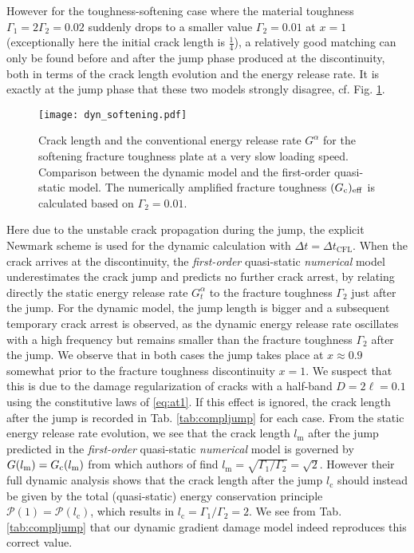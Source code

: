 However for the toughness-softening case where the material toughness $\Gamma_1=2\Gamma_2=0.02$ suddenly drops to a smaller value $\Gamma_2=0.01$ at $x=1$ (exceptionally here the initial crack length is $\frac{1}{4}$), a relatively good matching can only be found before and after the jump phase produced at the discontinuity, both in terms of the crack length evolution and the energy release rate. It is exactly at the jump phase that these two models strongly disagree, cf. Fig. \ref{eq:ressoftening}.
\begin{figure}[htbp]
\centering
\texttt{[image: dyn\_softening.pdf]}
\caption{Crack length and the conventional energy release rate $G^\alpha$ for the softening fracture toughness plate at a very slow loading speed. Comparison between the dynamic model and the first-order quasi-static model. The numerically amplified fracture toughness $(G_\mathrm{c})_\mathrm{eff}$ is calculated based on $\Gamma_2=0.01$.} \label{eq:ressoftening}
\end{figure}
Here due to the unstable crack propagation during the jump, the explicit Newmark scheme is used for the dynamic calculation with $\Delta t=\Delta t_\mathrm{CFL}$. When the crack arrives at the discontinuity, the \emph{first-order} quasi-static \emph{numerical} model underestimates the crack jump and predicts no further crack arrest, by relating directly the static energy release rate $G^\alpha_t$ to the fracture toughness $\Gamma_2$ just after the jump. For the dynamic model, the jump length is bigger and a subsequent temporary crack arrest is observed, as the dynamic energy release rate oscillates with a high frequency but remains smaller than the fracture toughness $\Gamma_2$ after the jump. We observe that in both cases the jump takes place at $x\approx 0.9$ somewhat prior to the fracture toughness discontinuity $x=1$. We suspect that this is due to the damage regularization of cracks with a half-band $D=2\ell=0.1$ using the constitutive laws of \eqref{eq:at1}. If this effect is ignored, the crack length after the jump is recorded in Tab. \ref{tab:compljump} for each case. From the static energy release rate evolution, we see that the crack length $l_\mathrm{m}$ after the jump predicted in the \emph{first-order} quasi-static \emph{numerical} model is governed by $G(l_\mathrm{m})=G_\mathrm{c}(l_\mathrm{m})$ from which authors of \cite{DumouchelMarigoCharlotte:2008} find $l_\mathrm{m}=\sqrt{\Gamma_1/\Gamma_2}=\sqrt{2}$. However their full dynamic analysis shows that the crack length after the jump $l_\mathrm{c}$ should instead be given by the total (quasi-static) energy conservation principle $\mathcal{P}(1)=\mathcal{P}(l_\mathrm{c})$, which results in $l_\mathrm{c}=\Gamma_1/\Gamma_2=2$. We see from Tab. \ref{tab:compljump} that our dynamic gradient damage model indeed reproduces this correct value.
